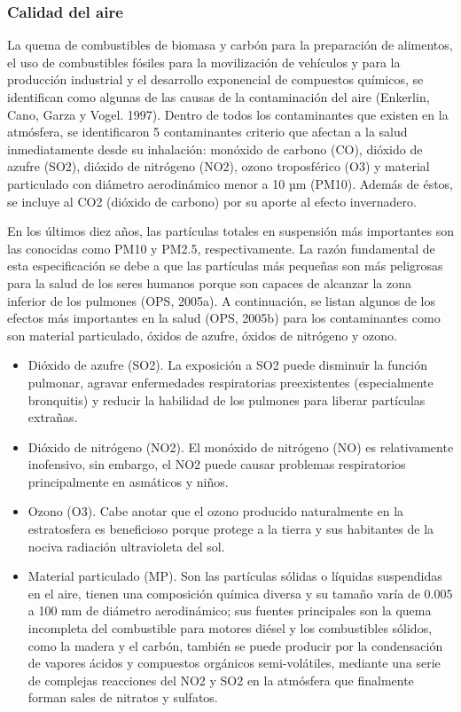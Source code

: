 \subsubsection{Calidad del aire}

La quema de combustibles de biomasa y carbón para la preparación de alimentos, el uso de combustibles fósiles para la movilización de vehículos y para la producción industrial y el desarrollo exponencial de compuestos químicos, se identifican como algunas de las causas de la contaminación del aire (Enkerlin, Cano, Garza y Vogel. 1997).
Dentro de todos los contaminantes que existen en la atmósfera, se identificaron 5 contaminantes criterio que afectan a la salud inmediatamente desde su inhalación: monóxido de carbono (CO), dióxido de azufre (SO2), dióxido de nitrógeno (NO2), ozono troposférico (O3) y material particulado con diámetro aerodinámico menor a 10 µm (PM10). Además de éstos, se incluye al CO2 (dióxido de carbono) por su aporte al efecto invernadero.

En los últimos diez años, las partículas totales en suspensión más importantes son las conocidas como PM10 y PM2.5, respectivamente. La razón fundamental de esta especificación se debe a que las partículas más pequeñas son más peligrosas para la salud de los seres humanos porque son capaces de alcanzar la zona inferior de los pulmones (OPS, 2005a). A continuación, se listan algunos de los efectos más importantes en la salud (OPS, 2005b) para los contaminantes  como son material particulado, óxidos de azufre, óxidos de nitrógeno y ozono.

\begin{itemize}
	\item Dióxido de azufre (SO2). La exposición a SO2 puede disminuir la función pulmonar, agravar enfermedades respiratorias preexistentes (especialmente bronquitis) y reducir la habilidad de los pulmones para liberar partículas extrañas.
	\item Dióxido de nitrógeno (NO2). El monóxido de nitrógeno (NO) es relativamente inofensivo, sin embargo, el NO2 puede causar problemas respiratorios principalmente en asmáticos y niños.
	\item Ozono (O3). Cabe anotar que el ozono producido naturalmente en la estratosfera es beneficioso porque protege a la tierra y sus habitantes de la nociva radiación ultravioleta del sol.
	\item Material particulado (MP). Son las partículas sólidas o líquidas suspendidas en el aire, tienen una composición química diversa y su tamaño varía de 0.005 a 100 mm de diámetro aerodinámico; sus
	fuentes principales son la quema incompleta del combustible para motores diésel y los combustibles sólidos, como la madera y el carbón, también se puede producir por la condensación de vapores ácidos y compuestos orgánicos semi-volátiles, mediante una serie de complejas reacciones del NO2 y SO2 en la atmósfera que finalmente forman sales de nitratos y sulfatos.
\end{itemize}

